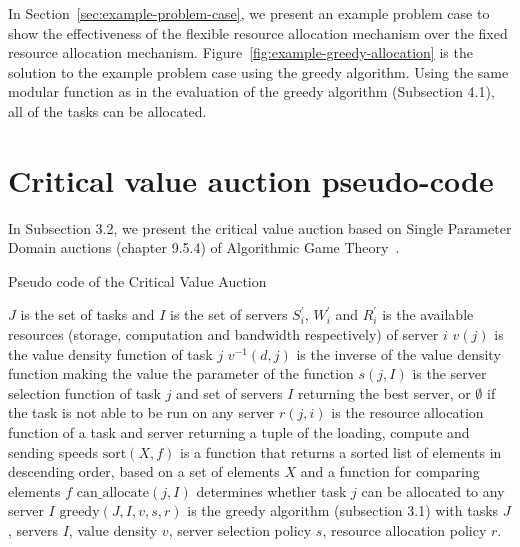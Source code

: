 \documentclass[sigconf]{aamas}
\begin{document}
In Section~\ref{sec:example-problem-case}, we present an example problem case to show the effectiveness of the flexible resource allocation mechanism over the fixed resource allocation mechanism. Figure~\ref{fig:example-greedy-allocation} is the solution to the example problem case using the greedy algorithm. Using the same modular function as in the evaluation of the greedy algorithm (Subsection 4.1), all of the tasks can be allocated. 

\section{Critical value auction pseudo-code}
In Subsection 3.2, we present the critical value auction based on Single Parameter Domain auctions (chapter 9.5.4)
of Algorithmic Game Theory~\cite{nisan2007algorithmic_cva}. 

\begin{algorithm}[h]
    \caption{Pseudo code of the Critical Value Auction}
    \label{alg:critical-value-auction}
    \begin{algorithmic}
        \REQUIRE $J$ is the set of tasks and $I$ is the set of servers
        \REQUIRE $S^{'}_i$, $W^{'}_i$ and $R^{'}_i$ is the available resources (storage, computation and bandwidth respectively) of server $i$
        \REQUIRE $v(j)$ is the value density function of task $j$
        \REQUIRE $v^{-1}(d, j)$ is the inverse of the value density function making the value the parameter of the function
        \REQUIRE $s(j, I)$ is the server selection function of task $j$ and set of servers $I$ returning the best server, or $\emptyset$ if the task is not able to be run on any server
        \REQUIRE $r(j, i)$ is the resource allocation function of a task and server returning a tuple of the loading, compute and sending speeds
        \REQUIRE $\text{sort}(X, f)$ is a function that returns a sorted list of elements in descending order, based on a set of elements $X$ and a function for comparing elements $f$
        \REQUIRE $\text{can\_allocate}(j, I)$ determines whether task $j$ can be allocated to any server $I$
        \REQUIRE $\text{greedy}(J, I, v, s, r)$ is the greedy algorithm (subsection 3.1) with tasks $J$, servers $I$, value density $v$, server selection policy $s$, resource allocation policy $r$.

                    \ENDIF
                    \ENDIF
                \ENDIF
            \ENDFOR
        \ENDFOR
    \end{algorithmic}
\end{algorithm}
\end{document}
